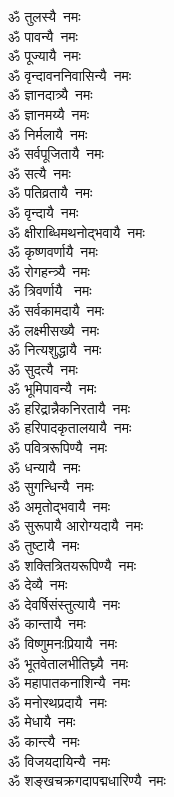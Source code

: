 \begin{multicols}{2}
\begin{flushleft}
ॐ तुलस्यै~नमः\\
ॐ पावन्यै~नमः\\
ॐ पूज्यायै~नमः\\
ॐ वृन्दावननिवासिन्यै~नमः\\
ॐ ज्ञानदात्र्यै~नमः\\
ॐ ज्ञानमय्यै~नमः\\
ॐ निर्मलायै~नमः\\
ॐ सर्वपूजितायै~नमः\\
ॐ सत्यै~नमः\\
ॐ पतिव्रतायै~नमः\hfill{}‌\\
ॐ वृन्दायै~नमः\\
ॐ क्षीराब्धिमथनोद्भवायै~नमः\\
ॐ कृष्णवर्णायै~नमः\\
ॐ रोगहन्त्र्यै~नमः\\
ॐ त्रिवर्णायै ~नमः\\
ॐ सर्वकामदायै~नमः\\
ॐ लक्ष्मीसख्यै~नमः\\
ॐ नित्यशुद्धायै~नमः\\
ॐ सुदत्यै~नमः\\
ॐ भूमिपावन्यै~नमः\hfill{}‌\\
ॐ हरिद्रान्नैकनिरतायै~नमः\\
ॐ हरिपादकृतालयायै~नमः\\
ॐ पवित्ररूपिण्यै~नमः\\
ॐ धन्यायै~नमः\\
ॐ सुगन्धिन्यै~नमः\\
ॐ अमृतोद्भवायै~नमः\\
ॐ सुरूपायै आरोग्यदायै~नमः\\
ॐ तुष्टायै~नमः\\
ॐ शक्तित्रितयरूपिण्यै~नमः\\
ॐ देव्यै~नमः\hfill{}‌\\
ॐ देवर्षिसंस्तुत्यायै~नमः\\
ॐ कान्तायै~नमः\\
ॐ विष्णुमनःप्रियायै~नमः\\
ॐ भूतवेतालभीतिघ्न्यै~नमः\\
ॐ महापातकनाशिन्यै~नमः\\
ॐ मनोरथप्रदायै~नमः\\
ॐ मेधायै~नमः\\
ॐ कान्त्यै~नमः\\
ॐ विजयदायिन्यै~नमः\\
ॐ शङ्खचक्रगदापद्मधारिण्यै~नमः\hfill{}‌\\

\end{flushleft}
\end{multicols}
